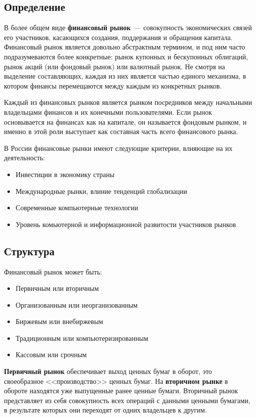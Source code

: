 \documentclass[14pt]{matmex-diploma-custom}
\begin{document}
\subsection{Определение}

В более общем виде \textbf{финансовый рынок}~--- совокупность экономических связей его участников, касающихся создания, поддержания и обращения капитала. Финансовый рынок является довольно абстрактным термином, и под ним часто подразумеваются более конкретные: рынок купонных и бескупонных облигаций, рынок акций (или фондовый рынок) или валютный рынок. Не смотря на выделение составляющих, каждая из них является частью единого механизма, в котором финансы перемещаются между каждым из конкретных рынков.

Каждый из финансовых рынков является рынком посредников между начальными владельцами финансов и их конечными пользователями. Если рынок основывается на финансах как на капитале, он называется фондовым рынком, и именно в этой роли выступает как составная часть всего финансового рынка.

В России финансовые рынки имеют следующие критерии, влияющие на их деятельность:

\begin{itemize}
\item Инвестиции в экономику страны
\item Международные рынки, влиние тенденций глобализации
\item Современные компьютерные технологии
\item Уровень комьютерной и информационной развитости участников рынков
\end{itemize}

\subsection{Структура}

Финансовый рынок может быть:

\begin{itemize}
\item Первичным или вторичным
\item Организованным или неорганизованным
\item Биржевым или внебиржевым
\item Традиционным или компьютеризированным
\item Кассовым или срочным
\end{itemize}

\textbf{Первичный рынок} обеспечивает выход ценных бумаг в оборот, это своеобразное <<производство>> ценных бумаг. На \textbf{вторичном рынке} в обороте находятся уже выпущенные ранее ценные бумаги. Вторичный рынок представляет из себя совокупность всех операций с данными ценными бумагами, в результате которых они переходят от одних владельцев к другим.
\end{document}
